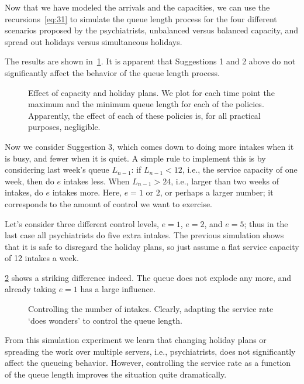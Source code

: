 Now that we have modeled the arrivals and the capacities, we can use the recursions~\cref{eq:31} to simulate the queue length process for the four different scenarios proposed by the psychiatrists, unbalanced versus balanced capacity, and spread out holidays versus simultaneous holidays.

The results are shown in~\cref{fig:balanced}.
It is apparent that Suggestions 1 and 2 above do not significantly affect the behavior of the queue length process.



\begin{figure}[ht]
  \centering
 
\caption{Effect of capacity and holiday plans. We plot for each time point
  the maximum and the minimum queue length for each of the
  policies. Apparently, the effect of each of these policies is, for
  all practical purposes, negligible.  }
\label{fig:balanced}
\end{figure}


Now we consider Suggestion 3, which comes down to doing more intakes when it is busy, and fewer when it is quiet.
A simple rule to implement this is by considering last week's queue $L_{n-1}$: if $L_{n-1}<12$, i.e., the service capacity of one week, then do $e$ intakes less.
When $L_{n-1}>24$, i.e., larger than two weeks of intakes, do $e$ intakes more.
Here, $e=1$ or $2$, or perhaps a larger number; it corresponds to the amount of control we want to exercise.

Let's consider three different control levels, $e=1$, $e=2$, and $e=5$; thus in 
the last case all psychiatrists do five extra intakes. The previous simulation 
shows that it is safe to disregard the holiday plans, so just assume a flat 
service capacity of 12 intakes a week.

\cref{fig:intakes} shows a striking difference indeed. The queue
does not explode any more, and already taking $e=1$ has a large
influence. 

\begin{figure}[ht]
  \centering
  
\caption{Controlling the number of intakes. Clearly, adapting the
  service rate `does wonders' to control the queue length.}
\label{fig:intakes}
\end{figure}

From this simulation experiment we learn that changing holiday plans or spreading the work over multiple servers, i.e., psychiatrists, does not significantly affect the queueing behavior.
However, controlling the service rate as a function of the queue length improves the situation quite dramatically.


